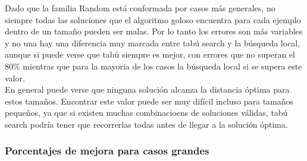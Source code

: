 \begin{figure}[h] 
 \centering
       \label{fig:randomDist1}
    \label{fig:randomMejora1}
\end{figure}

Dado que la familia Random está conformada por casos más generales, no siempre todas las soluciones que el algoritmo goloso encuentra para cada ejemplo dentro de un tamaño pueden ser malas. Por lo tanto los errores son más variables y no una hay una diferencia muy marcada entre tabú search y la búsqueda local, aunque si puede verse que tabú siempre es mejor, con errores que no superan el 80\% mientras que para la mayoria de los casos la búsqueda local si se supera este valor.\\

En general puede verse que ninguna solución alcanza la distancia óptima para estos tamaños. Encontrar este valor puede ser muy difícil incluso para tamaños pequeños, ya que si existen muchas combinacioens de soluciones válidas, tabú search podría tener que recorrerlas todas antes de llegar a la solución óptima.\\

\subsubsection*{Porcentajes de mejora para casos grandes}

